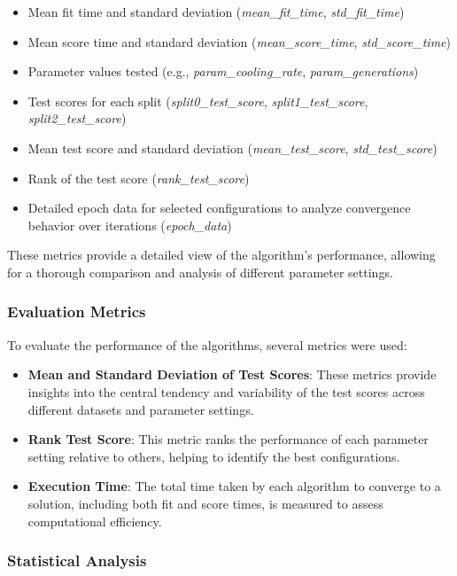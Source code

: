 \documentclass{article}
\begin{document}
    \begin{itemize}
        \item Mean fit time and standard deviation (\textit{mean\_fit\_time}, \textit{std\_fit\_time})
        \item Mean score time and standard deviation (\textit{mean\_score\_time}, \textit{std\_score\_time})
        \item Parameter values tested (e.g., \textit{param\_cooling\_rate}, \textit{param\_generations})
        \item Test scores for each split (\textit{split0\_test\_score}, \textit{split1\_test\_score}, \textit{split2\_test\_score})
        \item Mean test score and standard deviation (\textit{mean\_test\_score}, \textit{std\_test\_score})
        \item Rank of the test score (\textit{rank\_test\_score})
        \item Detailed epoch data for selected configurations to analyze convergence behavior over iterations (\textit{epoch\_data})
    \end{itemize}

    These metrics provide a detailed view of the algorithm's performance, allowing for a thorough comparison and analysis of different parameter settings.

    \subsubsection{Evaluation Metrics}

    To evaluate the performance of the algorithms, several metrics were used:

    \begin{itemize}
        \item \textbf{Mean and Standard Deviation of Test Scores}: These metrics provide insights into the central tendency and variability of the test scores across different datasets and parameter settings.
        \item \textbf{Rank Test Score}: This metric ranks the performance of each parameter setting relative to others, helping to identify the best configurations.
        \item \textbf{Execution Time}: The total time taken by each algorithm to converge to a solution, including both fit and score times, is measured to assess computational efficiency.
    \end{itemize}

    \subsubsection{Statistical Analysis}
\end{document}
